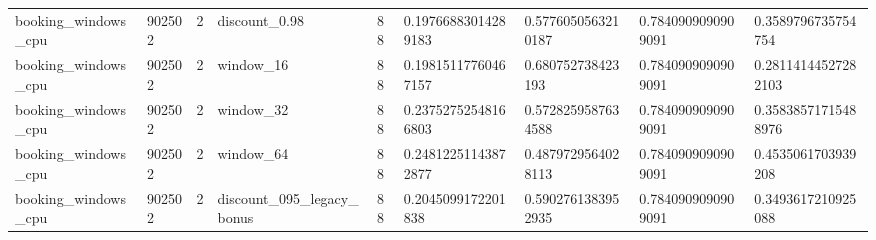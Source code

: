 \begin{tabular}{lllllllll}
booking\_windows\_cpu & 902502 & 2 & discount\_0.98 & 88 & 0.19766883014289183 & 0.5776050563210187 & 0.7840909090909091 & 0.3589796735754754 \\
booking\_windows\_cpu & 902502 & 2 & window\_16 & 88 & 0.19815117760467157 & 0.680752738423193 & 0.7840909090909091 & 0.28114144527282103 \\
booking\_windows\_cpu & 902502 & 2 & window\_32 & 88 & 0.23752752548166803 & 0.5728259587634588 & 0.7840909090909091 & 0.35838571715488976 \\
booking\_windows\_cpu & 902502 & 2 & window\_64 & 88 & 0.24812251143872877 & 0.4879729564028113 & 0.7840909090909091 & 0.4535061703939208 \\
booking\_windows\_cpu & 902502 & 2 & discount\_095\_legacy\_bonus & 88 & 0.2045099172201838 & 0.5902761383952935 & 0.7840909090909091 & 0.3493617210925088 \\
\end{tabular}
